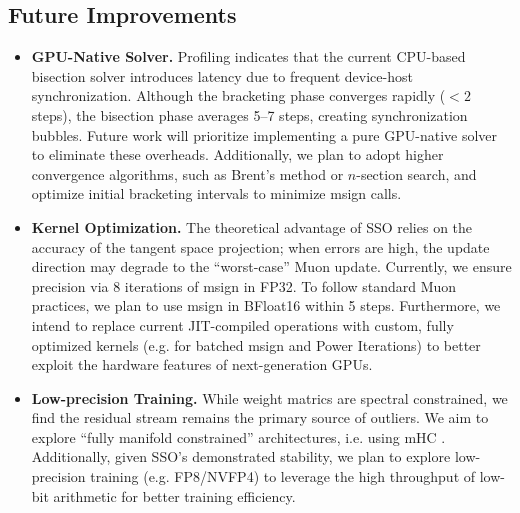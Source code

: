 \subsection{Future Improvements}
\label{sec:infra_future}
\begin{itemize}[left=0pt]
    \item \textbf{GPU-Native Solver.}
    Profiling indicates that the current CPU-based bisection solver introduces latency due to frequent device-host synchronization. Although the bracketing phase converges rapidly ($<2$ steps), the bisection phase averages 5--7 steps, creating synchronization bubbles. Future work will prioritize implementing a pure GPU-native solver to eliminate these overheads. Additionally, we plan to adopt higher convergence algorithms,  such as Brent's method or $n$-section search, and optimize initial bracketing intervals to minimize msign calls.

    \item \textbf{Kernel Optimization.}
    The theoretical advantage of SSO relies on the accuracy of the tangent space projection; when errors are high, the update direction may degrade to the ``worst-case'' Muon update. Currently, we ensure precision via 8 iterations of msign in FP32. To follow standard Muon practices, we plan to use msign in BFloat16 within 5 steps. Furthermore, we intend to replace current JIT-compiled operations with custom, fully optimized kernels (e.g. for batched msign and Power Iterations) to better exploit the hardware features of next-generation GPUs.

    \item \textbf{Low-precision Training.}
    While weight matrics are spectral constrained, we find the residual stream remains the primary source of outliers. We aim to explore ``fully manifold constrained'' architectures, i.e. using mHC \citep{xie2025mhcmanifoldconstrainedhyperconnections}. Additionally, given SSO's demonstrated stability, we plan to explore low-precision training (e.g. FP8/NVFP4) to leverage the high throughput of low-bit arithmetic for better training efficiency.
\end{itemize}
